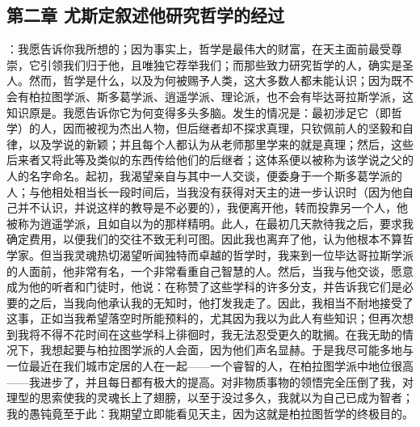 \par

\par


\subsection{第二章 尤斯定叙述他研究哲学的经过}

：我愿告诉你我所想的；因为事实上，哲学是最伟大的财富，在天主面前最受尊崇，它引领我们归于他，且唯独它荐举我们；而那些致力研究哲学的人，确实是圣人。然而，哲学是什么，以及为何被赐予人类，这大多数人都未能认识；因为既不会有柏拉图学派、斯多葛学派、逍遥学派、理论派，也不会有毕达哥拉斯学派，这知识原是。我愿告诉你它为何变得多头多脑。发生的情况是：最初涉足它（即哲学）的人，因而被视为杰出人物，但后继者却不探求真理，只钦佩前人的坚毅和自律，以及学说的新颖；并且每个人都认为从老师那里学来的就是真理；然后，这些后来者又将此等及类似的东西传给他们的后继者；这体系便以被称为该学说之父的人的名字命名。起初，我渴望亲自与其中一人交谈，便委身于一个斯多葛学派的人；与他相处相当长一段时间后，当我没有获得对天主的进一步认识时（因为他自己并不认识，并说这样的教导是不必要的），我便离开他，转而投靠另一个人，他被称为逍遥学派，且如自以为的那样精明。此人，在最初几天款待我之后，要求我确定费用，以便我们的交往不致无利可图。因此我也离弃了他，认为他根本不算哲学家。但当我灵魂热切渴望听闻独特而卓越的哲学时，我来到一位毕达哥拉斯学派的人面前，他非常有名，一个非常看重自己智慧的人。然后，当我与他交谈，愿意成为他的听者和门徒时，他说：在称赞了这些学科的许多分支，并告诉我它们是必要的之后，当我向他承认我的无知时，他打发我走了。因此，我相当不耐地接受了这事，正如当我希望落空时所能预料的，尤其因为我以为此人有些知识；但再次想到我将不得不花时间在这些学科上徘徊时，我无法忍受更久的耽搁。在我无助的情况下，我想起要与柏拉图学派的人会面，因为他们声名显赫。于是我尽可能多地与一位最近在我们城市定居的人在一起——一个睿智的人，在柏拉图学派中地位很高——我进步了，并且每日都有极大的提高。对非物质事物的领悟完全压倒了我，对理型的思索使我的灵魂长上了翅膀，以至于没过多久，我就以为自己已成为智者；我的愚钝竟至于此：我期望立即能看见天主，因为这就是柏拉图哲学的终极目的。\par

